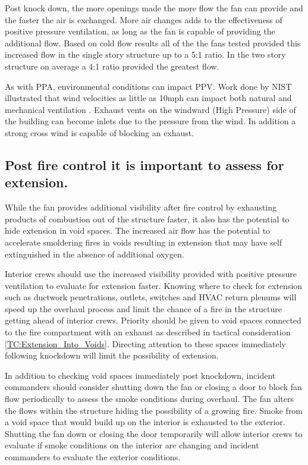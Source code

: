 \documentclass{article}
\begin{document}
Post knock down, the more openings made the more flow the fan can provide and the faster the air is exchanged. More air changes adds to the effectiveness of positive pressure ventilation, as long as the fan is capable of providing the additional flow. Based on cold flow results all of the the fans tested provided this increased flow in the single story structure up to a 5:1 ratio. In the two story structure on average a 4:1 ratio provided the greatest flow. 

As with PPA, environmental conditions can impact PPV. Work done by NIST illustrated that wind velocities as little as 10mph can impact both natural and mechanical ventilation \cite{KerberMadrzykowskiLabWindDriven}. Exhaust vents on the windward (High Pressure) side of the building can become inlets due to the pressure from the wind. In addition a strong cross wind is capable of blocking an exhaust. 

\subsection{Post fire control it is important to assess for extension.} \label{Assess_For_Extension}
While the fan provides additional visibility after fire control by exhausting products of combustion out of the structure faster, it also has the potential to hide extension in void spaces. The increased air flow has the potential to accelerate smoldering fires in voids resulting in extension that may have self extinguished in the absence of additional oxygen. 

Interior crews should use the increased visibility provided with positive pressure ventilation to evaluate for extension faster. Knowing where to check for extension such as ductwork penetrations, outlets, switches and HVAC return plenums will speed up the overhaul process and limit the chance of a fire in the structure getting ahead of interior crews. Priority should be given to void spaces connected to the fire compartment with an exhaust as described in tactical consideration \ref{TC:Extension_Into_Voids}. Directing attention to these spaces immediately following knockdown will limit the possibility of extension.  

In addition to checking void spaces immediately post knockdown, incident commanders should consider shutting down the fan or closing a door to block fan flow periodically to assess the smoke conditions during overhaul. The fan alters the flows within the structure hiding the possibility of a growing fire. Smoke from a void space that would build up on the interior is exhausted to the exterior. Shutting the fan down or closing the door temporarily will allow interior crews to evaluate if smoke conditions on the interior are changing and incident commanders to evaluate the exterior conditions.
\end{document}
